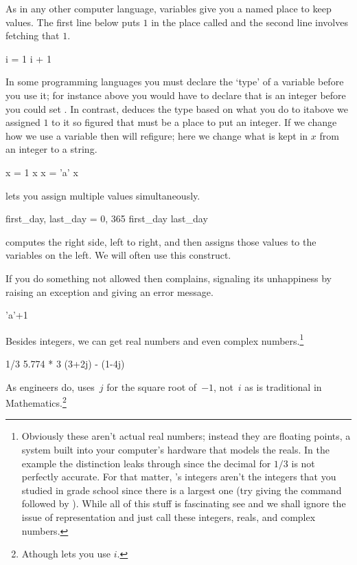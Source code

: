 As in any other computer language, 
variables give you a named place to keep values.
The first line below puts $1$ in the place called 
and the second line involves fetching that $1$.
\begin{pythonconsole}
i = 1
i + 1
\end{pythonconsole}
In some programming languages you must declare the `type' of a variable
before you use it; for instance above you would have to declare 
that  is an integer before you could set .
In contrast, \python{} deduces the type 
based on what you do to it\Dash above we assigned $1$ to it
so \python{} figured that  must be a place to put an integer.
If we change how we use a variable then \python{} will 
refigure; here we change what is kept in $x$ from an integer to a string.
\begin{pythonconsole}
x = 1
x
x = 'a'
x
\end{pythonconsole}

\python{} lets you assign multiple values simultaneously.
\begin{pythonconsole}
first_day, last_day = 0, 365
first_day
last_day   
\end{pythonconsole}
\noindent
\python{} computes the right side, left to right, and then assigns 
those values to the variables on the left.
We will often use this construct.

If you do something not allowed then 
\python{} complains, signaling its unhappiness by 
raising an exception and giving an error 
message.
\begin{pythonconsole}
'a'+1
\end{pythonconsole}

Besides integers, we can get real numbers 
and even complex numbers.\footnote{Obviously these aren't actual 
real numbers; instead they are floating points, a system 
built into your computer's hardware that
models the reals.
In the example the distinction leaks through
since the decimal for $1/3$ is not perfectly accurate.
For that matter, \protect\python's integers aren't the integers that you studied
in grade school since there is a largest one (try giving \python{} the 
command \protect{} followed by 
\protect{}). 
While all of this stuff is fascinating\protect\Dash
see \protect\cite{PythonTeam19a} and \protect\cite{Goldberg91}\protect\Dash
we shall ignore the issue of representation and just call these 
integers, reals, and complex numbers.}
\begin{pythonconsole}
1/3
5.774 * 3
(3+2j) - (1-4j)
\end{pythonconsole}
\noindent As engineers do, \python{} uses~$j$ for the square
root of~$-1$, not~$i$ as is traditional in Mathematics.\footnote{Athough
\protect\Sage{} lets you use $i$.}

